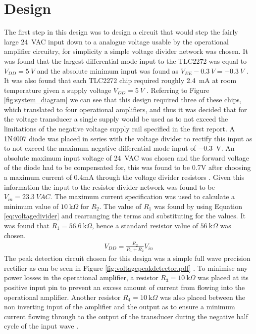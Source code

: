 \section{Design} \label{sec:design_voltage_peak_transducer}
The first step in this design was to design a circuit that would step the fairly large \SI{24}{VAC} input down to a analogue voltage usable by the operational amplifier circuitry, for simplicity a simple voltage divider network was chosen. It was found that the largest differential mode input to the TLC2272 was equal to $V_{DD}=\SI{5}{V}$ and the absolute minimum input was found as $V_{EE}-\SI{0.3}{V}=\SI{-0.3}{V}$ \cite{TLC2272:2016}. It was also found that each TLC2272 chip required roughly \SI{2.4}{\milli A} at room temperature given a supply voltage $V_{DD}=\SI{5}{V}$ \cite{TLC2272:2016}. Referring to Figure \ref{fig:system_diagram} we can see that this design required three of these chips, which translated to four operational amplifiers, and thus it was decided that for the voltage transducer a single supply would be used as to not exceed the limitations of the negative voltage supply rail specified in the first report. 
A 1N4007 diode was placed in series with the voltage divider to rectify this input as to not exceed the maximum negative differential mode input of \SI{-0.3}{V}. An absolute maximum input voltage of \SI{24}{VAC} was chosen and the forward voltage of the diode had to be compensated for, this was found to be 0.7V after choosing a maximum current of 0.4mA through the voltage divider resistors \cite{1N4007:2014}. Given this information the input to the resistor divider network was found to be $V_{in}=\SI{23.3}{VAC}$. The maximum current specification was used to calculate a minimum value of $\SI{10}{\kilo \Omega}$ for $R_{2}$. The value of $R_{1}$ was found by using Equation \ref{eq:voltagedivider} and rearranging the terms and substituting for the values. It was found that $R_{1}=\SI{56.6}{\kilo \Omega}$, hence a standard resistor value of $\SI{56}{\kilo \Omega}$ was chosen.\newline
\begin{align}
   V_{DD}=\frac{R_2}{R_1+R_2}V_{in}
   \label{eq:voltagedivider}
\end{align}
The peak detection circuit chosen for this design was a simple full wave precision rectifier as can be seen in Figure \ref{fig:voltagepeakdetector.pdf} \cite{PrecisionRectifierFullwave}. To minimise any power losses in the operational amplifier, a resistor $R_3=\SI{10}{\kilo \Omega}$ was placed at its positive input pin to prevent an excess amount of current from flowing into the operational amplifier. Another resistor $R_4=\SI{10}{\kilo \Omega}$ was also placed between the non inverting input of the amplifier and the output as to ensure a minimum current flowing through to the output of the transducer during the negative half cycle of the input wave \cite{PrecisionRectifierFullwave}. 
